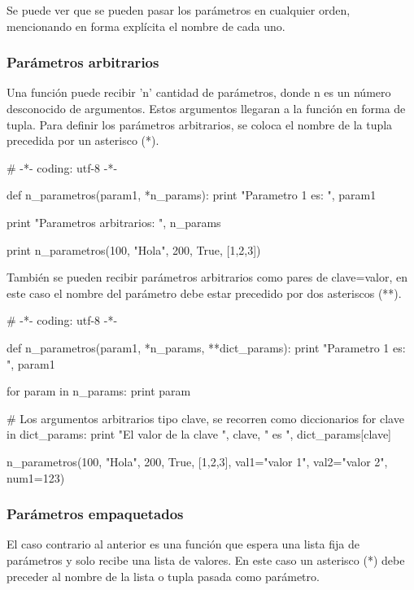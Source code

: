 Se puede ver que se pueden pasar los parámetros en cualquier orden, mencionando en forma explícita el nombre de cada uno.

\subsubsection{Parámetros arbitrarios}

Una función puede recibir 'n' cantidad de parámetros, donde n es un número desconocido de argumentos. Estos argumentos llegaran a la función en forma de tupla. Para definir los parámetros arbitrarios, se coloca el nombre de la tupla precedida por un asterisco (*).\\

\begin{pyglist} [language=python]
# -*- coding: utf-8 -*-

def n_parametros(param1, *n_params):
    print "Parametro 1 es: ", param1

    print "Parametros arbitrarios: ", n_params
        
print n_parametros(100, "Hola", 200, True, [1,2,3])
\end{pyglist}

También se pueden recibir parámetros arbitrarios como pares de clave=valor, en este caso el nombre del parámetro debe estar precedido por dos asteriscos (**).\\

\begin{pyglist} [language=python]
# -*- coding: utf-8 -*-

def n_parametros(param1, *n_params, **dict_params):
    print "Parametro 1 es: ", param1

    for param in n_params:
        print param

    # Los argumentos arbitrarios tipo clave, se recorren como diccionarios
    for clave in dict_params:
        print "El valor de la clave ", clave, " es ", dict_params[clave]


n_parametros(100, "Hola", 200, True, [1,2,3], val1="valor 1",
                   val2="valor 2", num1=123)
\end{pyglist}


\subsubsection{Parámetros empaquetados}

El caso contrario al anterior es una función que espera una lista fija de parámetros y solo recibe una lista de valores. En este caso un asterisco (*) debe preceder al nombre de la lista o tupla pasada como parámetro. \\

